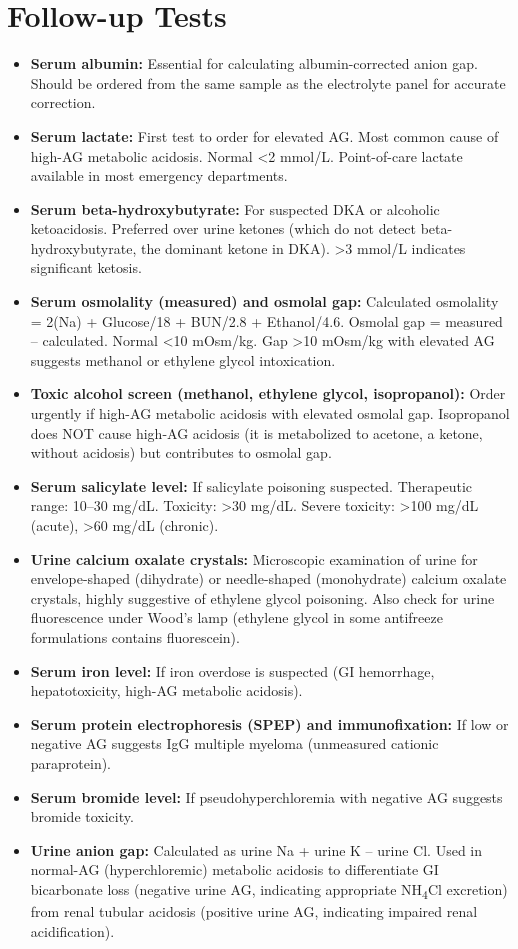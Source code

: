 \section*{Follow-up Tests}
\begin{itemize}
  \item \textbf{Serum albumin:} Essential for calculating albumin-corrected anion gap. Should be ordered from the same sample as the electrolyte panel for accurate correction.
  \item \textbf{Serum lactate:} First test to order for elevated AG. Most common cause of high-AG metabolic acidosis. Normal <2 mmol/L. Point-of-care lactate available in most emergency departments.
  \item \textbf{Serum beta-hydroxybutyrate:} For suspected DKA or alcoholic ketoacidosis. Preferred over urine ketones (which do not detect beta-hydroxybutyrate, the dominant ketone in DKA). >3 mmol/L indicates significant ketosis.
  \item \textbf{Serum osmolality (measured) and osmolal gap:} Calculated osmolality = 2(Na) + Glucose/18 + BUN/2.8 + Ethanol/4.6. Osmolal gap = measured -- calculated. Normal <10 mOsm/kg. Gap >10 mOsm/kg with elevated AG suggests methanol or ethylene glycol intoxication.
  \item \textbf{Toxic alcohol screen (methanol, ethylene glycol, isopropanol):} Order urgently if high-AG metabolic acidosis with elevated osmolal gap. Isopropanol does NOT cause high-AG acidosis (it is metabolized to acetone, a ketone, without acidosis) but contributes to osmolal gap.
  \item \textbf{Serum salicylate level:} If salicylate poisoning suspected. Therapeutic range: 10--30 mg/dL. Toxicity: >30 mg/dL. Severe toxicity: >100 mg/dL (acute), >60 mg/dL (chronic).
  \item \textbf{Urine calcium oxalate crystals:} Microscopic examination of urine for envelope-shaped (dihydrate) or needle-shaped (monohydrate) calcium oxalate crystals, highly suggestive of ethylene glycol poisoning. Also check for urine fluorescence under Wood's lamp (ethylene glycol in some antifreeze formulations contains fluorescein).
  \item \textbf{Serum iron level:} If iron overdose is suspected (GI hemorrhage, hepatotoxicity, high-AG metabolic acidosis).
  \item \textbf{Serum protein electrophoresis (SPEP) and immunofixation:} If low or negative AG suggests IgG multiple myeloma (unmeasured cationic paraprotein).
  \item \textbf{Serum bromide level:} If pseudohyperchloremia with negative AG suggests bromide toxicity.
  \item \textbf{Urine anion gap:} Calculated as urine Na + urine K -- urine Cl. Used in normal-AG (hyperchloremic) metabolic acidosis to differentiate GI bicarbonate loss (negative urine AG, indicating appropriate NH\textsubscript{4}Cl excretion) from renal tubular acidosis (positive urine AG, indicating impaired renal acidification).
\end{itemize}


